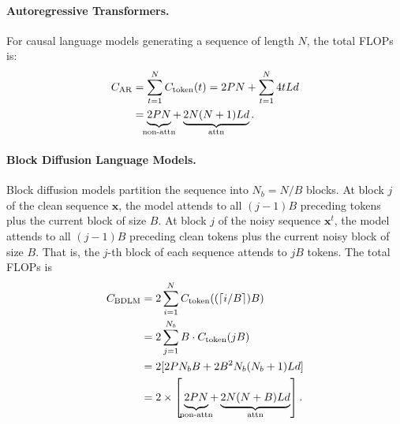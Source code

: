\paragraph{Autoregressive Transformers.}
For causal language models generating a sequence of length $N$, the total FLOPs is:
\begin{equation}
\begin{aligned}
    C_{\text{AR}} &= \sum_{t=1}^{N} C_{\text{token}}(t) = 2PN + \sum_{t=1}^{N} 4t L d \\
    &= \underbrace{2PN\vphantom{()}}_{\mathclap{\text{non-attn}}} + \underbrace{2N(N+1) L d}_{\mathclap{\text{attn}}}.
\end{aligned}
\end{equation}

\paragraph{Block Diffusion Language Models.}
Block diffusion models partition the sequence into $N_b = N / B$ blocks.
At block $j$ of the clean sequence $\mathbf{x}$, the model attends to all $(j-1)B$ preceding tokens plus the current block of size $B$.
At block $j$ of the noisy sequence $\mathbf{x}^{t}$, the model attends to all $(j-1)B$ preceding clean tokens plus the current noisy block of size $B$.
That is, the $j$-th block of each sequence attends to $jB$ tokens.
The total FLOPs is
\begin{equation}
\begin{aligned}
    C_{\text{BDLM}} &= 2 \sum_{i=1}^{N} C_{\text{token}}((\lceil i/B \rceil)B) \\
    &= 2 \sum_{j=1}^{N_b} B \cdot C_{\text{token}}(jB) \\
    &= 2 [2P N_b B + 2 B^2 N_b(N_b+1) L d] \\
    &= 2\times \left[\hspace{0.2em}\underbrace{2PN\vphantom{()}}_{\mathclap{\text{non-attn}}} + \underbrace{2N(N+B) L d}_{\mathclap{\text{attn}}}\right].
\end{aligned}
\end{equation}

